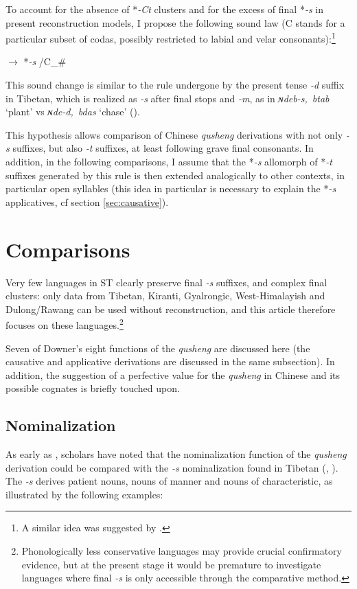 \documentclass[oneside,a4paper,11pt]{article}
\newcommand{\ipa}[1]{{\phon\textit{\mbox{#1}}}}
\begin{document}
To account for the absence of *\ipa{-Ct} clusters and for the excess of final *\ipa{-s} in present reconstruction models, I propose the following sound law (C stands for a particular subset of codas, possibly restricted to labial and velar consonants):\footnote{A similar idea was suggested by \citet[42]{schuessler07}.}

\begin{exe}
\ex \label{ex:ts}
\glt *\ipa{-t} $\rightarrow$ *\ipa{-s} /C\_\# 
\end{exe}

This sound change is similar to the rule undergone by the present tense \ipa{-d} suffix in Tibetan, which is realized as \ipa{-s} after final stops and \ipa{-m}, as in \ipa{ɴdeb-s, btab}   `plant' vs \ipa{ɴde-d, bdas}   `chase' (\citealt[52-53]{coblin76}). 

This hypothesis allows comparison of Chinese \textit{qusheng} derivations with not only \ipa{-s} suffixes, but also \ipa{-t} suffixes, at least following grave final consonants. In addition, in the following comparisons, I assume that the *\ipa{-s} allomorph of *\ipa{-t} suffixes generated by this rule is then extended analogically to other contexts, in particular open syllables (this idea in particular is necessary to explain the *\ipa{-s} applicatives, cf section \ref{sec:causative}).


\section{Comparisons}

Very few languages in ST clearly preserve final \ipa{-s} suffixes, and complex final clusters: only data from Tibetan, Kiranti, Gyalrongic, West-Himalayish and Dulong/Rawang can be used without reconstruction, and this article therefore focuses on these languages.\footnote{Phonologically less conservative languages may provide crucial confirmatory evidence, but at the present stage it would be premature to investigate languages where final \ipa{-s} is only accessible through the comparative method. }

Seven of Downer's eight functions of the \textit{qusheng} are discussed here (the causative and applicative derivations are discussed in the same subsection). In addition, the suggestion of a perfective value for the \textit{qusheng} in Chinese and its possible cognates is briefly touched upon.

\subsection{Nominalization} \label{sec:nmlz}
As early as \citet{forrest60occlusives}, scholars have noted that the nominalization function of the \textit{qusheng} derivation could be compared with the \ipa{-s} nominalization found in Tibetan (\citealt[43]{conrady1896}, \citealt[624-5]{hill14derivational}). The \ipa{-s} derives patient nouns, nouns of manner and nouns of characteristic, as illustrated by the following examples:
\end{document}
